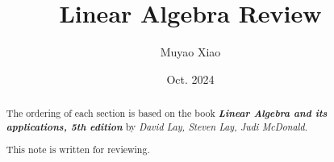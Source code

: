 \documentclass[a4paper]{report}
\title{Linear Algebra Review}
\author{Muyao Xiao}
\date{Oct. 2024}
\begin{document}
\maketitle

\begin{abstract}
    The ordering of each section is based on the book \textbf{\textit{Linear Algebra and its applications, 5th edition}} by  \textit{David Lay, Steven Lay, Judi McDonald}.
    \par 
    This note is written for reviewing.
\end{abstract}

\tableofcontents







\pagestyle{plain}
\printbibliography{}
\end{document}
